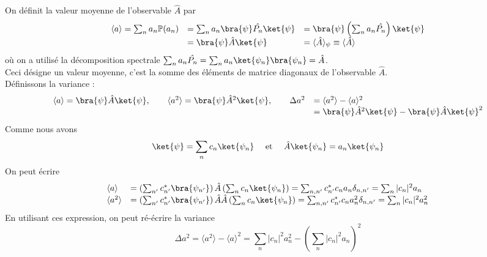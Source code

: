 On définit la valeur moyenne de l'observable $\hat{A}$ par
 \begin{equation}
\begin{array}{lll}
 \langle a\rangle = \sum_n a_n\mathbb{P}(a_n) &= \sum_n a_n\bra{\psi}\hat{P_n}\ket{\psi} &=  
 \bra{\psi}\left(\sum_n a_n\hat{P_n}\right)\ket{\psi}\\
 &= \bra{\psi}\hat{A}\ket{\psi} &= \langle \hat{A}\rangle_\psi \equiv \langle\hat{A}\rangle
\end{array}
 \end{equation}
 où on a utilisé la décomposition spectrale $\sum_n a_n\hat{P_n} = \sum_n a_n\ket{\psi_n}\bra{\psi_n}
 = \hat{A} $.\\
 Ceci désigne un valeur moyenne, c'est la somme des éléments de matrice diagonaux de 
 l'observable $\hat{A}$. \\
 Définissons la variance :
 \begin{equation}
 \begin{array}{ll}
 \langle a\rangle = \bra{\psi}\hat{A}\ket{\psi},\qquad  \langle a^2\rangle = \bra{\psi}\hat{A}^2
 \ket{\psi}, \qquad \Delta a^2 &=  \langle a^2\rangle - \langle a\rangle^2\\
 &= \bra{\psi}\hat{A}^2\ket{\psi} - \bra{\psi}\hat{A}\ket{\psi}^2
 \end{array}
 \end{equation}
 Comme nous avons 
 \begin{equation}
 \ket{\psi} = \sum_n c_n \ket{\psi_n}\quad\text{ et }\quad \hat{A}\ket{\psi_n}=a_n\ket{\psi_n}
 \end{equation}
 On peut écrire
 \begin{equation}
 \begin{array}{ll}
 \langle a \rangle &= \left(\sum_{n'} c_{n'}^*\bra{\psi_{n'}}\right)\hat{A}\left(
 \sum_n c_n\ket{\psi_n}\right)= \sum_{n,n'} c_{n'}^*c_n a_n\delta_{n,n'} = \sum_n |c_n|^2 a_n\\
 \langle a^2 \rangle &= \left(\sum_{n'} c_{n'}^*\bra{\psi_{n'}}\right)\hat{A}\hat{A}\left(
 \sum_n c_n\ket{\psi_n}\right)= \sum_{n,n'} c_{n'}^*c_n a_n^2\delta_{n,n'} = \sum_n |c_n|^2 a_n^2 
 \end{array}
 \end{equation}
 En utilisant ces expression, on peut ré-écrire la variance
 \begin{equation}
 \Delta a^2 = \langle a^2\rangle - \langle a\rangle^2 = \sum_n |c_n|^2 a_n^2 - 
 \left(\sum_n |c_n|^2 a_n\right)^2
 \end{equation}
